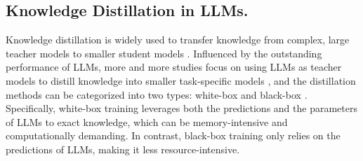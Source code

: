 \subsection{Knowledge Distillation in LLMs.} 
Knowledge distillation is widely used to transfer knowledge from complex, large teacher models to smaller student models \cite{hinton2015distilling}.
Influenced by the outstanding performance of LLMs, more and more studies focus on using LLMs as teacher models to distill knowledge into smaller task-specific models \cite{brown-etal-2023-efficient}, and the distillation methods can be categorized into two types: white-box \cite{gu2023minillm, agarwal2023gkd, udagawa-etal-2023-comparative} and black-box \cite{li2022explanations, ho2022large, hsieh2023distilling}.
Specifically, white-box training leverages both the predictions and the parameters of LLMs to exact knowledge, which can be memory-intensive and computationally demanding. 
In contrast, black-box training only relies on the predictions of LLMs, making it less resource-intensive.

